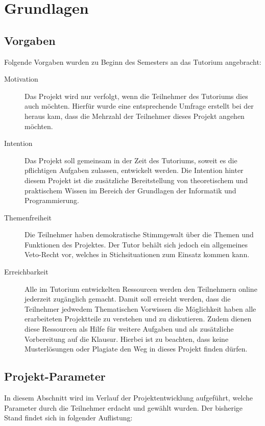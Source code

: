 
\section{Grundlagen}
\label{ch:basics}

\subsection{Vorgaben}
\label{ch:presets}
Folgende Vorgaben wurden zu Beginn des Semesters an das Tutorium angebracht:
\begin{description}
	\item[Motivation] Das Projekt wird nur verfolgt, wenn die Teilnehmer des Tutoriums dies auch möchten. Hierfür wurde eine entsprechende Umfrage erstellt bei der heraus kam, dass die Mehrzahl der Teilnehmer dieses Projekt angehen möchten.
	\item[Intention] Das Projekt soll gemeinsam in der Zeit des Tutoriums, soweit es die pflichtigen Aufgaben zulassen, entwickelt werden. Die Intention hinter diesem Projekt ist die zusätzliche Bereitstellung von theoretischem und praktischem Wissen im Bereich der Grundlagen der Informatik und Programmierung.
	\item[Themenfreiheit] Die Teilnehmer haben demokratische Stimmgewalt über die Themen und Funktionen des Projektes. Der Tutor behält sich jedoch ein allgemeines Veto-Recht vor, welches in Stichsituationen zum Einsatz kommen kann.
	\item[Erreichbarkeit] Alle im Tutorium entwickelten Ressourcen werden den Teilnehmern online jederzeit zugänglich gemacht. Damit soll erreicht werden, dass die Teilnehmer jedwedem Thematischen Vorwissen die Möglichkeit haben alle erarbeiteten Projektteile zu verstehen und zu diskutieren. Zudem dienen diese Ressourcen als Hilfe für weitere Aufgaben und als zusätzliche Vorbereitung auf die Klausur. Hierbei ist zu beachten, dass keine Musterlösungen oder Plagiate den Weg in dieses Projekt finden dürfen.
\end{description}

\subsection{Projekt-Parameter}
\label{ch:params}
In diesem Abschnitt wird im Verlauf der Projektentwicklung aufgeführt, welche Parameter durch die Teilnehmer erdacht und gewählt wurden. Der bisherige Stand findet sich in folgender Auflistung:
